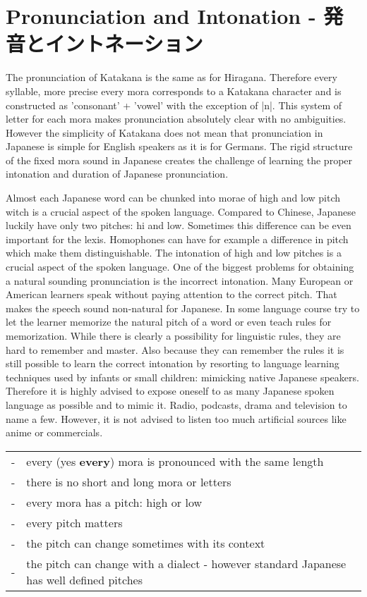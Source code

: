 \section{Pronunciation and Intonation - 発音とイントネーション}\label{sec:PronunciationAndIntonation}

The pronunciation of Katakana is the same as for Hiragana. Therefore every
syllable, more precise every mora corresponds to a Katakana character and is
constructed as 'consonant' + 'vowel' with the exception of |n|. This system of
letter for each mora makes pronunciation absolutely clear with no ambiguities.
However the simplicity of Katakana does not mean that pronunciation in Japanese
is simple for English speakers as it is for Germans.  The rigid structure of
the fixed mora sound in Japanese creates the challenge of learning the proper
intonation and duration of Japanese pronunciation.

Almost each Japanese word can be chunked into morae of high and low pitch witch
is a crucial aspect of the spoken language. Compared to Chinese, Japanese
luckily have only two pitches: hi and low. Sometimes this difference can be
even important for the lexis. Homophones can have for example a difference in
pitch which make them distinguishable.  The intonation of high and low pitches
is a crucial aspect of the spoken language. One of the biggest problems for
obtaining a natural sounding pronunciation is the incorrect intonation. Many
European or American learners speak without paying attention to the correct
pitch. That makes the speech sound non-natural for Japanese. In some language
course try to let the learner memorize the natural pitch of a word or even
teach rules for memorization. While there is clearly a possibility for
linguistic rules, they are hard to remember and master. Also because they can
remember the rules it is still possible to learn the correct intonation by
resorting to language learning techniques used by infants or small children:
mimicking native Japanese speakers. Therefore it is highly advised to expose
oneself to as many Japanese spoken language as possible and to mimic it. Radio,
podcasts, drama and television to name a few. However, it is not advised to
listen too much artificial sources like anime or commercials.

\bigskip
\begin{tabular}{rl}
-&every (yes \textbf{every}) mora is pronounced with the same length\\
-&there is no short and long mora or letters\\
-&every mora has a pitch: high or low\\
-&every pitch matters\\
-&the pitch can change  sometimes with its context\\
-&the pitch can change with a dialect - however standard Japanese has well defined pitches\\
\end{tabular}

